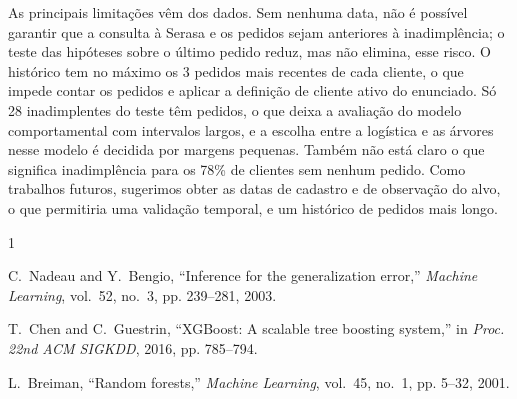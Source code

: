 \documentclass[conference]{IEEEtran}
\begin{document}
As principais limitações vêm dos dados. Sem nenhuma data, não é possível garantir que a consulta à Serasa e os pedidos sejam anteriores à inadimplência; o teste das hipóteses sobre o último pedido reduz, mas não elimina, esse risco. O histórico tem no máximo os 3 pedidos mais recentes de cada cliente, o que impede contar os pedidos e aplicar a definição de cliente ativo do enunciado. Só 28 inadimplentes do teste têm pedidos, o que deixa a avaliação do modelo comportamental com intervalos largos, e a escolha entre a logística e as árvores nesse modelo é decidida por margens pequenas. Também não está claro o que significa inadimplência para os 78\% de clientes sem nenhum pedido. Como trabalhos futuros, sugerimos obter as datas de cadastro e de observação do alvo, o que permitiria uma validação temporal, e um histórico de pedidos mais longo.

\begin{thebibliography}{1}

C.~Nadeau and Y.~Bengio, ``Inference for the generalization error,'' \emph{Machine Learning}, vol.~52, no.~3, pp. 239--281, 2003.

T.~Chen and C.~Guestrin, ``XGBoost: A scalable tree boosting system,'' in \emph{Proc. 22nd ACM SIGKDD}, 2016, pp. 785--794.

L.~Breiman, ``Random forests,'' \emph{Machine Learning}, vol.~45, no.~1, pp. 5--32, 2001.

\end{thebibliography}
\end{document}
